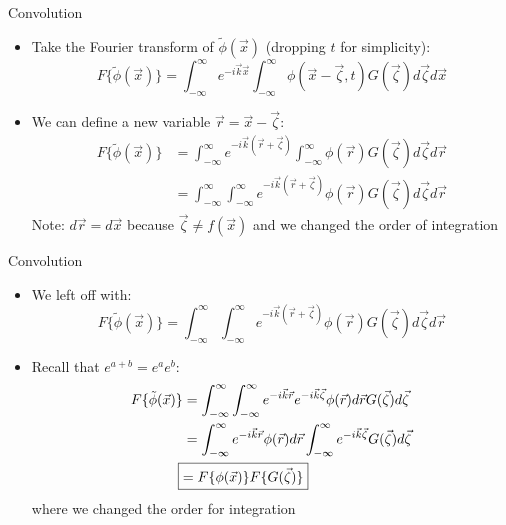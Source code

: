 \begin{frame}{Convolution}

\begin{itemize}
	\item Take the Fourier transform of $\tilde \phi (\vec{x})$ (dropping $t$ for simplicity):
	$$F\{\tilde \phi(\vec{x})\} = \int_{-\infty}^{\infty} e^{-i\vec{k}\vec{x}} \int_{-\infty}^{\infty} \phi (\vec{x} - \vec{\zeta},t) G(\vec{\zeta}) d \vec{\zeta} d \vec{x}$$
	\item We can define a new variable $\vec{r} = \vec{x} - \vec{\zeta}$:
	\begin{align*}
	F\{\tilde \phi(\vec{x})\} &= \int_{-\infty}^{\infty} e^{-i\vec{k}(\vec{r} + \vec{\zeta})} \int_{-\infty}^{\infty} \phi(\vec{r}) G(\vec{\zeta}) d\vec{\zeta} d\vec{r}\\
	&= \int_{-\infty}^{\infty} \int_{-\infty}^{\infty} e^{-i\vec{k}(\vec{r} + \vec{\zeta})} \phi(\vec{r}) G(\vec{\zeta}) d\vec{\zeta} d\vec{r}
	\end{align*}
	Note: $d\vec{r} = d\vec{x}$ because $\vec{\zeta} \neq f(\vec{x})$ and we changed the order of integration
\end{itemize}
\end{frame}

\begin{frame}{Convolution}

\begin{itemize}
	\item We left off with: $$F\{\tilde \phi(\vec{x})\}= \int_{-\infty}^{\infty} \int_{-\infty}^{\infty} e^{-i\vec{k}(\vec{r} + \vec{\zeta})} \phi(\vec{r}) G(\vec{\zeta}) d\vec{\zeta} d\vec{r}$$
	\item Recall that $e^{a+b} = e^a e^b$:
	\begin{align*}
	F\{\tilde \phi(\vec{x})\} &= \int_{-\infty}^{\infty} \int_{-\infty}^{\infty} e^{-i\vec{k}\vec{r}} e^{-i\vec{k}\vec{\zeta}} \phi(\vec{r}) d\vec{r}  G(\vec{\zeta}) d\vec{\zeta}\\
	&= \int_{-\infty}^{\infty} e^{-i\vec{k}\vec{r}} \phi(\vec{r}) d\vec{r} \int_{-\infty}^{\infty} e^{-i\vec{k}\vec{\zeta}} G(\vec{\zeta}) d\vec{\zeta}\\
	\Aboxed{&= F\{\phi(\vec{x})\}F\{G(\vec{\zeta})\}}
	\end{align*}
	where we changed the order for integration
\end{itemize}
\end{frame}

